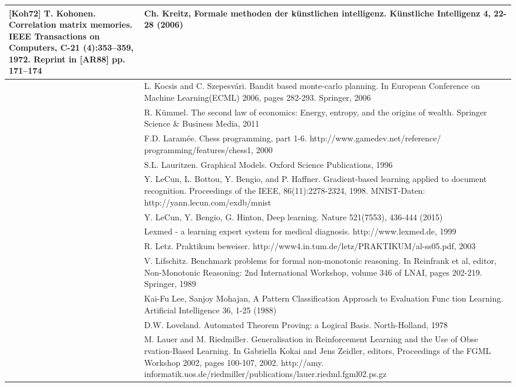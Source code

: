 \documentclass[10pt]{book}
\begin{document}
\begin{tabular}{|l|l|}
[Koh72] T. Kohonen. Correlation matrix memories. IEEE Transactions on Computers, C-21 (4):353–359, 1972. Reprint in [AR88] pp. 171–174
 & Ch. Kreitz, Formale methoden der künstlichen intelligenz. Künstliche Intelligenz 4, 22-28 (2006) \\
\hline [KS06] & L. Kocsis and C. Szepesvári. Bandit based monte-carlo planning. In European Conference on Machine Learning(ECML) 2006, pages 282-293. Springer, 2006 \\
\hline [Küm11] & R. Kümmel. The second law of economics: Energy, entropy, and the origins of wealth. Springer Science \& Business Media, 2011 \\
\hline [Lar00] & F.D. Laramée. Chess programming, part 1-6. http://www.gamedev.net/reference/ programming/features/chess1, 2000 \\
\hline [\cite{lauritzen1996graphical}] & S.L. Lauritzen. Graphical Models. Oxford Science Publications, 1996 \\
\hline [LBBH98] & Y. LeCun, L. Bottou, Y. Bengio, and P. Haffner. Gradient-based learning applied to document recognition. Proceedings of the IEEE, 86(11):2278-2324, 1998. MNIST-Daten: http://yann.lecun.com/exdb/mnist \\
\hline [LBH15] & Y. LeCun, Y. Bengio, G. Hinton, Deep learning. Nature 521(7553), 436-444 (2015) \\
\hline [Le999] & Lexmed - a learning expert system for medical diagnosis. http://www.lexmed.de, 1999 \\
\hline [\cite{letz2003praktikum}] & R. Letz. Praktikum beweiser. http://www4.in.tum.de/letz/PRAKTIKUM/al-ss05.pdf, 2003 \\
\hline [\cite{lifschitz1989benchmark}] & V. Lifschitz. Benchmark problems for formal non-monotonic reasoning. In Reinfrank et al, editor, Non-Monotonic Reasoning: 2nd International Workshop, volume 346 of LNAI, pages 202-219. Springer, 1989 \\
\hline [\cite{lee1988evaluation}] & Kai-Fu Lee, Sanjoy Mohajan, A Pattern Classification Approach to Evaluation Func tion Learning. Artificial Intelligence 36, 1-25 (1988) \\
\hline [Lov78] & D.W. Loveland. Automated Theorem Proving: a Logical Basis. North-Holland, 1978 \\
\hline [\cite{lauer2002fgml}] & M. Lauer and M. Riedmiller. Generalisation in Reinforcement Learning and the Use of Obse rvation-Based Learning. In Gabriella Kokai and Jens Zeidler, editors, Proceedings of the FGML Workshop 2002, pages 100-107, 2002. http://amy. informatik.uos.de/riedmiller/publications/lauer.riedml.fgml02.ps.gz \\

\end{tabular}
\end{document}

